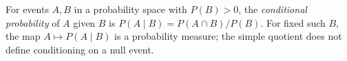 
For events $A,B$ in a probability space with $P(B)>0$, the \emph{conditional probability} of $A$ given $B$ is $P(A\mid B)=P(A\cap B)/P(B)$. For fixed such $B$, the map $A\mapsto P(A\mid B)$ is a probability measure; the simple quotient does not define conditioning on a null event.
